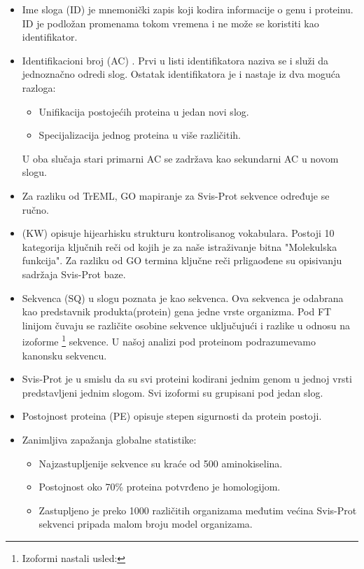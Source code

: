 \begin{itemize}
  \item Ime sloga (ID)  je mnemonički zapis koji kodira
    informacije o genu i proteinu. ID je podložan promenama tokom vremena
    i ne može se koristiti kao identifikator.
  \item Identifikacioni broj (AC) . Prvi u listi
    identifikatora naziva se  i služi da jednoznačno odredi
    slog. Ostatak identifikatora je  i nastaje iz dva
    moguća razloga:
    \begin{itemize}
      \item Unifikacija postojećih proteina u jedan novi slog. 
      \item Specijalizacija jednog proteina u više različitih.
    \end{itemize}
    U oba slučaja stari primarni AC se zadržava kao sekundarni AC u novom slogu.

  \item Za razliku od TrEML, GO mapiranje za Svis-Prot sekvence određuje se ručno.

  \item {}  (KW) opisuje hijearhisku strukturu
    kontrolisanog vokabulara. Postoji 10 kategorija ključnih reči od kojih je
    za naše istraživanje bitna "Molekulska funkcija".  Za razliku od GO termina
    ključne reči prligaođene su opisivanju sadržaja Svis-Prot baze.

  \item Sekvenca (SQ) u slogu poznata je kao  
    sekvenca. Ova sekvenca je odabrana kao predstavnik produkta(protein) gena
    jedne vrste organizma.  Pod FT linijom čuvaju se različite osobine sekvence
    uključujući i razlike u odnosu na izoforme \footnote{Izoformi nastali
      usled:  } sekvence.  U našoj analizi pod
    proteinom podrazumevamo kanonsku sekvencu.

  \item Svis-Prot je  u smislu da su svi proteini
    kodirani jednim genom u jednoj vrsti predstavljeni jednim slogom. Svi
    izoformi su grupisani pod jedan slog.

  \item Postojnost proteina (PE)  opisuje stepen
    sigurnosti da protein postoji.

  \item Zanimljiva zapažanja globalne statistike:
    \begin{itemize}
      \item Najzastupljenije sekvence su kraće od 500 aminokiselina.
      \item Postojnost oko 70\% proteina potvrđeno je homologijom.
      \item Zastupljeno je preko 1000 različitih organizama međutim
        većina Svis-Prot sekvenci pripada malom broju model organizama.
    \end{itemize}
      

\end{itemize}


